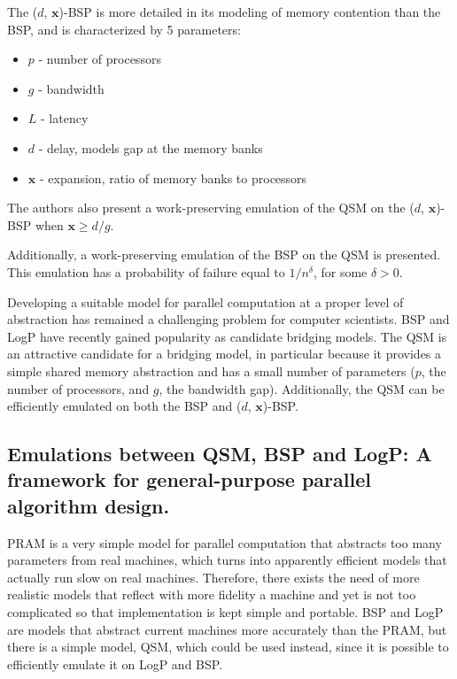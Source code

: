 \documentclass[12pt,a4paper]{article}
\begin{document}
The ($d$, $\textbf{x}$)-BSP is more detailed in its modeling of memory contention than the BSP, and is characterized by 5 parameters:

\begin{itemize}
\item $p$ - number of processors
\item $g$ - bandwidth
\item $L$ - latency
\item $d$ - delay, models gap at the memory banks
\item $\textbf{x}$ - expansion, ratio of memory banks to processors
\end{itemize}

The authors also present a work-preserving emulation of the QSM on the ($d$, $\textbf{x}$)-BSP when $\textbf{x} \geq d / g$.

Additionally, a work-preserving emulation of the BSP on the QSM is presented. This emulation has a probability of failure equal to
$1/n^\delta$, for some $\delta > 0$. 

Developing a suitable model for parallel computation at a proper level of abstraction has remained a challenging problem for computer scientists. BSP and LogP
have recently gained popularity as candidate bridging models. The QSM is an attractive candidate for a bridging model, in particular because it provides a
simple shared memory abstraction and has a small number of parameters ($p$, the number of processors, and $g$, the bandwidth gap). Additionally, the QSM can be
efficiently emulated on both the BSP and ($d$, $\textbf{x}$)-BSP.


\subsection{Emulations between QSM, BSP and LogP: A framework for general-purpose parallel algorithm design. \cite{Vlr03}}

PRAM is a very simple model for parallel computation that abstracts too many parameters from real machines, which turns into apparently efficient models that 
actually run slow on real machines. Therefore, there exists the need of more realistic models that reflect with more fidelity a machine and yet is not too 
complicated so that implementation is kept simple and portable. BSP and LogP are models that abstract current machines more accurately than the PRAM, 
but there is a simple model, QSM, which could be used instead, since it is possible to efficiently emulate it on LogP and BSP.
\end{document}
